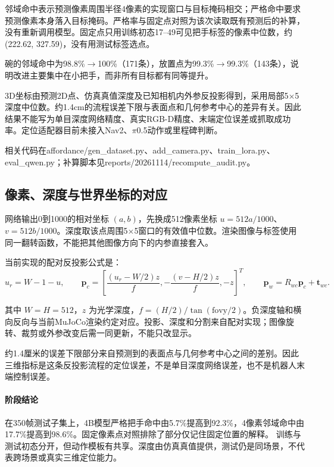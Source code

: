 邻域命中表示预测像素周围半径4像素的实现窗口与目标掩码相交；严格命中要求预测像素本身落入目标掩码。严格率与固定点对照为该次读取既有预测后的补算，没有重新调用模型。固定点只用训练初态17--49可见把手标签的像素中位数，约(222.62, 327.59)，没有用测试标签选点。

碗的邻域命中为98.8\%\(\rightarrow\)100\%（171条），放置点为99.3\%\(\rightarrow\)99.3\%（143条），说明改进主要集中在小把手，而非所有目标都有同等提升。

3D坐标由预测2D点、仿真真值深度及已知相机内外参反投影得到，采用局部5\(\times\)5深度中位数。约1.4cm的流程误差下限与表面点和几何参考中心的差异有关。因此结果不能写为单目深度网络精度、真实RGB-D精度、末端定位误差或抓取成功率。定位适配器目前未接入Nav2、\(\pi\)0.5动作或里程碑判断。

相关代码在affordance/gen\_dataset.py、add\_camera.py、train\_lora.py、eval\_qwen.py；补算脚本见reports/20261114/recompute\_audit.py。


\subsection{像素、深度与世界坐标的对应}\label{s17-detail-3}

网络输出0到1000的相对坐标 \((a,b)\)，先换成512像素坐标 \(u=512a/1000\)、\(v=512b/1000\)。深度取该点周围5\(\times\)5窗口的有效值中位数。渲染图像与标签使用同一翻转函数，不能把其他图像方向下的内参直接套入。

当前实现的配对反投影公式是： \[u_r=W-1-u,\qquad
 \boldsymbol p_c=\left[\frac{(u_r-W/2)z}{f},-\frac{(v-H/2)z}{f},-z\right]^T,
 \qquad\boldsymbol p_w=R_{wc}\boldsymbol p_c+\boldsymbol t_{wc}.\]

其中 \(W=H=512\)，\(z\) 为光学深度，\(f=(H/2)/\tan(\mathrm{fovy}/2)\)。负深度轴和横向反向与当前MuJoCo渲染约定对应。投影、深度和分割来自配对实现；图像旋转、裁剪或外参改变后需一同更新，不能只改显示。

约1.4厘米的误差下限部分来自预测到的表面点与几何参考中心之间的差别。因此三维指标是这条反投影流程的定位误差，不是单目深度网络误差，也不是机器人末端控制误差。



\paragraph{阶段结论}在350帧测试子集上，4B模型严格把手命中由5.7\%提高到92.3\%，4像素邻域命中由17.7\%提高到98.6\%。固定像素点对照排除了部分仅记住固定位置的解释。 训练与测试初态分开，但动作模板有共享。深度由仿真真值提供，测试仍是同场景，不代表跨场景或真实三维定位能力。

